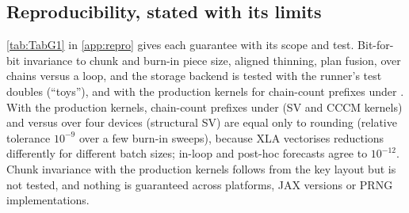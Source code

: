 \subsection{Reproducibility, stated with its limits}\label{sec:arch-repro}

\cref{tab:TabG1} in \cref{app:repro} gives each guarantee with its scope and test.
Bit-for-bit invariance to chunk and burn-in piece size, aligned thinning, plan fusion, 
over chains versus a loop, and the storage backend is tested with the runner's test doubles
(``toys''), and with the production kernels for chain-count prefixes under . %
With the production kernels, chain-count prefixes under  (SV and CCCM kernels) and
 versus  over four devices (structural SV) are equal only to rounding
(relative tolerance $10^{-9}$ over a few burn-in sweeps), because XLA vectorises reductions
differently for different batch sizes; in-loop and post-hoc forecasts agree to
$10^{-12}$. %
Chunk invariance with the production kernels follows from the key layout but is not
tested, %
and nothing is guaranteed across platforms, JAX versions or PRNG implementations.
